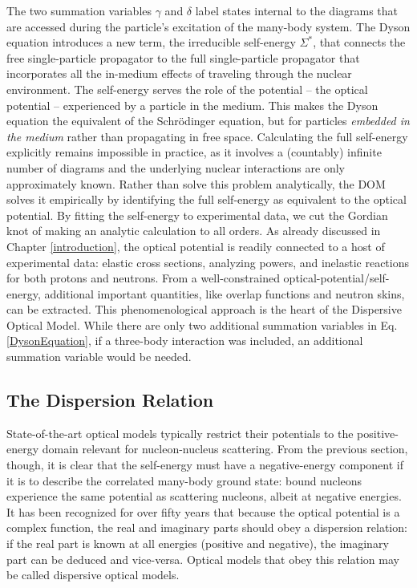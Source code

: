 The two summation variables $\gamma$ and $\delta$ label states internal to the diagrams that are 
accessed during the particle's excitation of the many-body system\footnotemark. The Dyson
equation introduces a new term, the irreducible self-energy $\Sigma^{*}$, that connects the free
single-particle propagator to the full single-particle propagator that incorporates all the
in-medium effects of traveling through the nuclear environment. The self-energy serves the role
of the potential -- the optical potential -- experienced by a particle in the medium.
This makes the Dyson equation the
equivalent of the Schr\"odinger equation, but for particles \textit{embedded in the medium} 
rather than propagating in free space. Calculating the full self-energy explicitly remains
impossible in practice,
as it involves a (countably) infinite number of diagrams and the underlying nuclear
interactions are only approximately known. Rather than solve this problem
analytically, the DOM solves it empirically by identifying the full self-energy as equivalent
to the optical potential. By fitting the self-energy to experimental data, we
cut the Gordian knot of making an analytic calculation to all orders.
As already discussed in Chapter \ref{introduction}, the optical potential is  
readily connected to a host of experimental data: elastic cross sections, analyzing powers, and 
inelastic reactions for both protons and neutrons.
From a well-constrained optical-potential/self-energy, additional important quantities, like
overlap functions and neutron skins, can be extracted. This phenomenological approach is the 
heart of the Dispersive Optical Model.
\footnotetext
{
    While there are only two additional summation variables in Eq.
    \ref{DysonEquation}, if a three-body interaction was included,
    an additional summation variable would be needed.
}

\subsection{The Dispersion Relation}
State-of-the-art optical models \cite{CH89, KoningDelaroche} typically
restrict their potentials to the
positive-energy domain relevant for nucleon-nucleus scattering. From the previous
section, though, it is clear that the self-energy must have a negative-energy component
if it is to describe the
correlated many-body ground state: bound nucleons experience the same potential
as scattering nucleons, albeit at negative energies.
It has been recognized for over fifty years \cite{FeshbachDispersionRelation,
Passatore1967} that because the optical potential is a complex function, the real and imaginary
parts should obey a dispersion relation: if the real part is known at all energies (positive and
negative), the imaginary part can be deduced and vice-versa. Optical models that obey this relation
may be called dispersive optical models.

